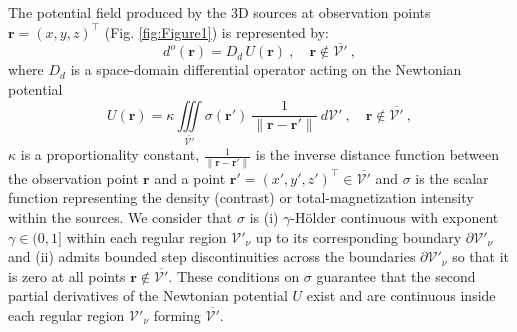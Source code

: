 The potential field produced by the 3D sources at observation points 
$\mathbf{r} = (x, y, z)^{\top}$ (Fig. \ref{fig:Figure1}) is represented by:
\begin{equation}
	d^{o}(\mathbf{r}) = D_{d} \, U(\mathbf{r}) \: , 
	\quad \mathbf{r} \notin \overline{\mathcal{V}'} \: ,
	\label{eq:observed-data-space}
\end{equation}
where $D_{d}$ is a space-domain differential operator acting on the Newtonian potential
\begin{equation}
	U(\mathbf{r}) = \kappa \iiint\limits_{\overline{\mathcal{V}'}}
	\sigma(\mathbf{r}') \: \frac{1}{\| \mathbf{r} - \mathbf{r}'\|}
	\: d\mathcal{V}' \: , 
	\quad \mathbf{r} \notin \overline{\mathcal{V}'} \: ,
	\label{eq:potential-U-space}
\end{equation}
$\kappa$ is a proportionality constant,
$\tfrac{1}{\| \mathbf{r} - \mathbf{r}' \|}$ is the inverse distance function
between the observation point $\mathbf{r}$ and a point 
$\mathbf{r}' = (x', y', z')^{\top} \in \overline{\mathcal{V}'}$
and $\sigma$ is the scalar function representing 
the density (contrast) or total-magnetization intensity within the sources.
We consider that $\sigma$ is 
(i) $\gamma$-Hölder continuous with exponent $\gamma \in (0, 1]$ 
\citep[][p. 14]{freeden_gerhards2012} within each regular region $\mathcal{V}'_{\nu}$ up to its corresponding boundary 
$\partial\mathcal{V}'_{\nu}$ and (ii) admits bounded step discontinuities across the boundaries $\partial\mathcal{V}'_{\nu}$ 
so that it is zero at all points $\mathbf{r} \notin \overline{\mathcal{V}'}$.
These conditions on $\sigma$ guarantee that the second partial derivatives of the Newtonian potential $U$ exist and 
are continuous inside each regular region $\mathcal{V}'_{\nu}$ forming $\overline{\mathcal{V}'}$.

